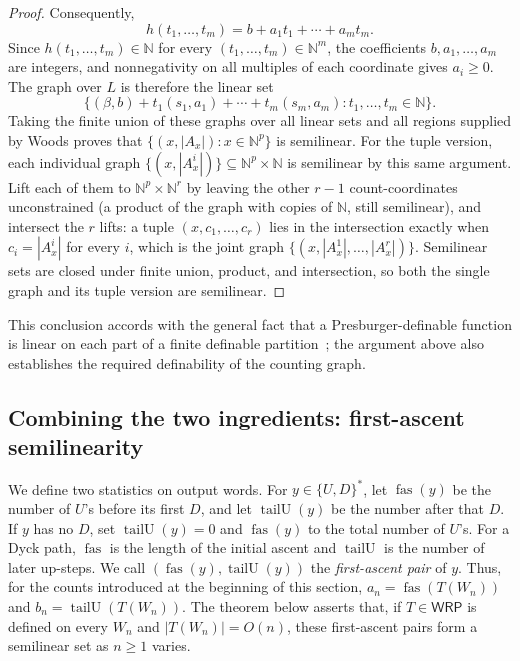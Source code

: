 \documentclass[11pt]{article}
\theoremstyle{definition}
\newcommand{\N}{\mathbb N}
\newcommand{\WRP}{\mathsf{WRP}}
\newcommand{\fas}{\operatorname{fas}}
\newcommand{\tailU}{\operatorname{tailU}}
\begin{document}
\begin{proof}
Consequently,
\[
   h(t_1,\ldots,t_m)=b+a_1t_1+\cdots+a_mt_m.
\]
Since $h(t_1,\ldots,t_m)\in\N$ for every $(t_1,\ldots,t_m)\in\N^m$, the coefficients
$b,a_1,\ldots,a_m$ are integers, and nonnegativity on all multiples of each
coordinate gives $a_i\ge0$.  The graph over $L$ is therefore the linear set
\[
   \{(\beta,b)+t_1(s_1,a_1)+\cdots+t_m(s_m,a_m):
       t_1,\ldots,t_m\in\N\}.
\]
Taking the finite union of these graphs over all linear sets and all regions
supplied by Woods proves that $\{(x,|A_x|):x\in\N^p\}$ is semilinear.  For the
tuple version, each individual graph
$\{(x,|A^i_x|)\}\subseteq\N^p\times\N$ is semilinear by this same argument.
Lift each of them to $\N^p\times\N^r$ by leaving the other $r-1$
count-coordinates unconstrained (a product of the graph with copies of $\N$,
still semilinear), and intersect the $r$ lifts: a tuple $(x,c_1,\ldots,c_r)$
lies in the intersection exactly when $c_i=|A^i_x|$ for every $i$, which is the
joint graph $\{(x,|A^1_x|,\ldots,|A^r_x|)\}$.  Semilinear sets are closed under
finite union, product, and intersection, so both the single graph and its tuple
version are semilinear.
\end{proof}

This conclusion accords with the general fact that a Presburger-definable
function is linear on each part of a finite definable
partition~\cite[Corollary~3.1.4]{CluckersHalupczok2018}; the argument above
also establishes the required definability of the counting graph.

\subsection{Combining the two ingredients: first-ascent semilinearity}

We define two statistics on output words.  For $y\in\{U,D\}^*$, let $\fas(y)$
be the number of $U$'s before its first $D$, and let $\tailU(y)$ be the number
after that $D$.
If $y$ has no $D$, set $\tailU(y)=0$ and $\fas(y)$ to the total number of
$U$'s.  For a Dyck path, $\fas$ is the length of the initial ascent and
$\tailU$ is the number of later up-steps.  We call
$(\fas(y),\tailU(y))$ the \emph{first-ascent pair} of $y$.  Thus, for the
counts introduced at the beginning of this section,
$a_n=\fas(T(W_n))$ and $b_n=\tailU(T(W_n))$.
The theorem below asserts that, if $T\in\WRP$ is defined on every $W_n$ and
$|T(W_n)|=O(n)$, these first-ascent pairs form a semilinear set as $n\ge1$
varies.
\end{document}
